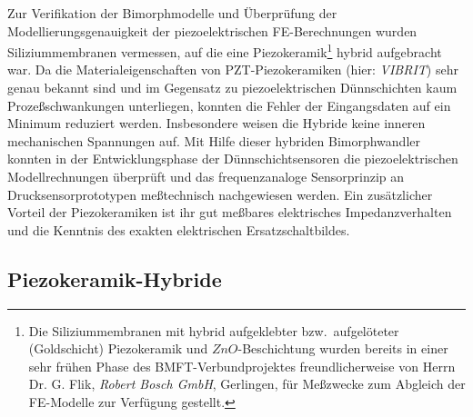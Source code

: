 Zur Verifikation der Bimorphmodelle und Überprüfung der
Modellierungsgenauigkeit der piezoelektrischen FE-Berechnungen wurden
Siliziummembranen vermessen, auf die eine
Piezokeramik\footnote{Die Siliziummembranen mit hybrid aufgeklebter
bzw.\ aufgelöteter (Goldschicht) Piezokeramik und
$ZnO$-Beschichtung wurden bereits in einer sehr frühen
Phase des BMFT-Verbundprojektes freundlicherweise von Herrn Dr. G. Flik,
{\sl Robert Bosch GmbH}, Gerlingen, für Meßzwecke zum Abgleich der
FE-Modelle zur Verfügung gestellt.} hybrid aufgebracht war. Da die
Materialeigenschaften von PZT-Piezokeramiken (hier: {\sl VIBRIT}) sehr
genau bekannt sind und im Gegensatz zu piezoelektrischen Dünnschichten
kaum Prozeßschwankungen unterliegen, konnten die Fehler der
Eingangsdaten auf ein Minimum reduziert werden. Insbesondere weisen die
Hybride keine inneren mechanischen Spannungen auf. Mit Hilfe dieser
hybriden Bimorphwandler konnten in der Entwicklungsphase der
Dünnschichtsensoren die piezoelektrischen Modellrechnungen überprüft und
das frequenzanaloge Sensorprinzip an Drucksensorprototypen meßtechnisch
nachgewiesen werden. Ein zusätzlicher Vorteil der Piezokeramiken ist ihr
gut meßbares elektrisches Impedanzverhalten und die Kenntnis des exakten
elektrischen Ersatzschaltbildes.\\


\subsection{Piezokeramik-Hybride}
\label{hybride}

